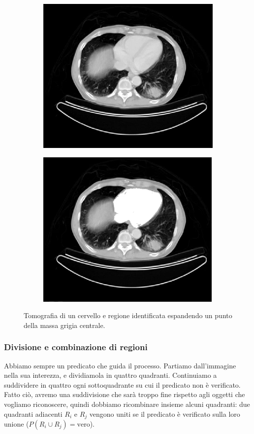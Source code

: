 \documentclass[a4paper,11pt]{article}
\begin{document}
\renewcommand{\thefigure}{10.9}
\begin{figure}[!h]
\centering
\begin{subfigure}{.5\textwidth}
  \centering
  \includegraphics[scale=0.4]{images/10/brain.png}
\end{subfigure}%
\begin{subfigure}{.5\textwidth}
  \centering
  \includegraphics[scale=0.4]{images/10/brain_result.png}
\end{subfigure}
\caption{Tomografia di un cervello e regione identificata espandendo un punto della massa grigia centrale.}
\end{figure}

\subsubsection{Divisione e combinazione di regioni}
Abbiamo sempre un predicato che guida il processo. Partiamo dall'immagine nella sua interezza, e dividiamola in quattro quadranti. Continuiamo a suddividere in quattro
ogni sottoquadrante su cui il predicato non è verificato. Fatto ciò, avremo una suddivisione che sarà troppo fine rispetto agli oggetti che vogliamo riconoscere,
quindi dobbiamo ricombinare insieme alcuni quadranti: due quadranti adiacenti $R_i$ e $R_j$ vengono uniti se il predicato è verificato sulla loro unione
($P(R_i \cup R_j) = \text{vero}$).
\end{document}
